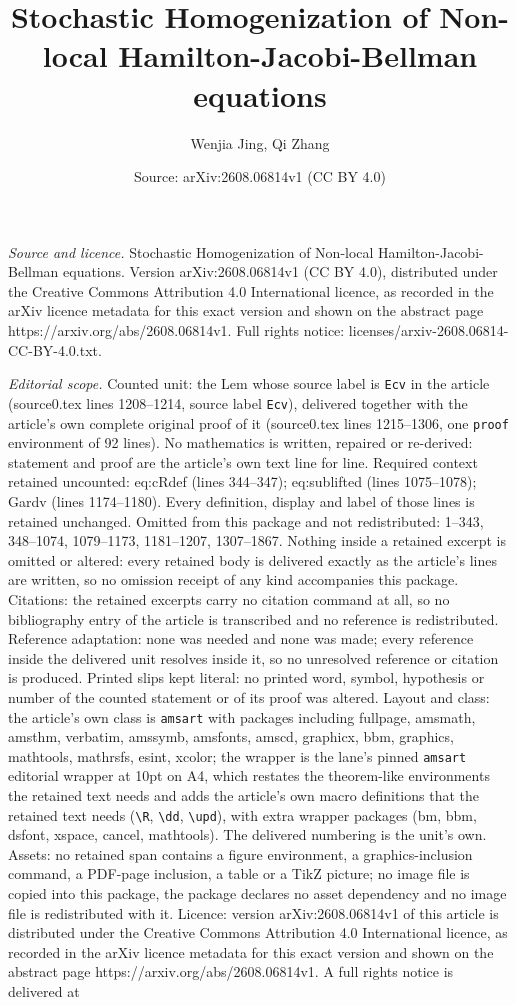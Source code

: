 \documentclass[10pt,a4paper]{amsart}
\title[Stochastic Homogenization of Non-local Hamilton-Jacobi-Bellm]{Stochastic Homogenization of Non-local Hamilton-Jacobi-Bellman equations}
\author{Wenjia Jing, Qi Zhang}
\date{Source: arXiv:2608.06814v1 (CC BY 4.0)}
\begin{document}
\maketitle

\noindent\emph{Source and licence.} Stochastic Homogenization of Non-local Hamilton-Jacobi-Bellman equations. Version arXiv:2608.06814v1 (CC BY 4.0), distributed under the Creative Commons Attribution 4.0 International licence, as recorded in the arXiv licence metadata for this exact version and shown on the abstract page https://arxiv.org/abs/2608.06814v1. Full rights notice: licenses/arxiv-2608.06814-CC-BY-4.0.txt.\par\smallskip

\noindent\textit{Editorial scope.} Counted unit: the Lem whose source label is \texttt{Ecv} in the article (source0.tex lines 1208--1214, source label \texttt{Ecv}), delivered together with the article's own complete original proof of it (source0.tex lines 1215--1306, one \texttt{proof} environment of 92 lines). No mathematics is written, repaired or re-derived: statement and proof are the article's own text line for line. Required context retained uncounted: eq:cRdef (lines 344--347); eq:sublifted (lines 1075--1078); Gardv (lines 1174--1180). Every definition, display and label of those lines is retained unchanged. Omitted from this package and not redistributed: 1--343, 348--1074, 1079--1173, 1181--1207, 1307--1867. Nothing inside a retained excerpt is omitted or altered: every retained body is delivered exactly as the article's lines are written, so no omission receipt of any kind accompanies this package. Citations: the retained excerpts carry no citation command at all, so no bibliography entry of the article is transcribed and no reference is redistributed. Reference adaptation: none was needed and none was made; every reference inside the delivered unit resolves inside it, so no unresolved reference or citation is produced. Printed slips kept literal: no printed word, symbol, hypothesis or number of the counted statement or of its proof was altered. Layout and class: the article's own class is \texttt{amsart} with packages including fullpage, amsmath, amsthm, verbatim, amssymb, amsfonts, amscd, graphicx, bbm, graphics, mathtools, mathrsfs, esint, xcolor; the wrapper is the lane's pinned \texttt{amsart} editorial wrapper at 10pt on A4, which restates the theorem-like environments the retained text needs and adds the article's own macro definitions that the retained text needs (\texttt{\textbackslash R}, \texttt{\textbackslash dd}, \texttt{\textbackslash upd}), with extra wrapper packages (bm, bbm, dsfont, xspace, cancel, mathtools). The delivered numbering is the unit's own. Assets: no retained span contains a figure environment, a graphics-inclusion command, a PDF-page inclusion, a table or a TikZ picture; no image file is copied into this package, the package declares no asset dependency and no image file is redistributed with it. Licence: version arXiv:2608.06814v1 of this article is distributed under the Creative Commons Attribution 4.0 International licence, as recorded in the arXiv licence metadata for this exact version and shown on the abstract page https://arxiv.org/abs/2608.06814v1. A full rights notice is delivered at 
\end{document}
